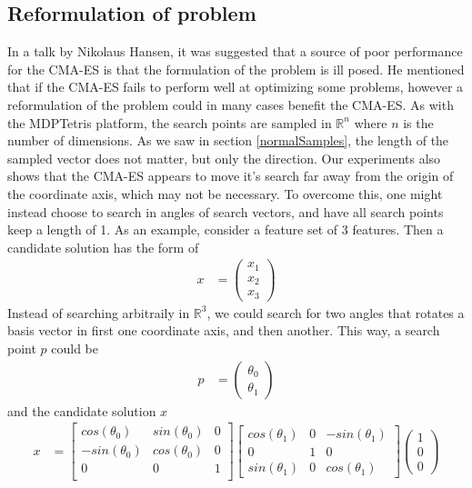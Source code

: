 \subsection{Reformulation of problem}

In a talk by Nikolaus Hansen, it was suggested that a source of poor performance 
for the CMA-ES is that the formulation of the problem is ill posed.
He mentioned that if the CMA-ES fails to perform well at optimizing some problems, however a reformulation of the problem could in many cases benefit the CMA-ES. As with the 
MDPTetris platform, the search points are sampled in $\mathbb{R}^n$ where 
$n$ is the number of dimensions. As we saw in section \ref{normalSamples}, the length 
of the sampled vector does not matter, but only the direction. Our experiments also shows that 
the CMA-ES appears to move it's search far away from the origin of the coordinate axis,
which may not be necessary. To overcome this, one might instead choose to search in angles 
of search vectors, and have all search points keep a length of 1. As an example, 
consider a feature set of 3 features. Then a candidate solution has the form of
\begin{align}
x &= \begin{pmatrix}
x_1 \\
x_2 \\
x_3
\end{pmatrix}
\end{align}
Instead of searching arbitraily in $\mathbb{R}^3$, we could search for two angles that rotates
a basis vector in first one coordinate axis, and then another. This way, a search point $p$ 
could be
\begin{align}
p &= \begin{pmatrix}
\theta_0\\
\theta_1
\end{pmatrix}
\end{align}
and the candidate solution $x$
\begin{align}
x &= 
\begin{bmatrix}
cos\left( \theta_0 \right) & sin\left( \theta_0 \right) & 0\\
-sin\left( \theta_0 \right) & cos\left( \theta_0 \right) & 0\\
0 & 0 & 1\\
\end{bmatrix}
\begin{bmatrix}
cos\left( \theta_1 \right) & 0 & -sin\left( \theta_1 \right)\\
0 & 1 & 0\\
sin\left( \theta_1 \right) & 0 & cos\left( \theta_1 \right)
\end{bmatrix}
\begin{pmatrix}
1\\
0\\
0
\end{pmatrix}
\end{align}
